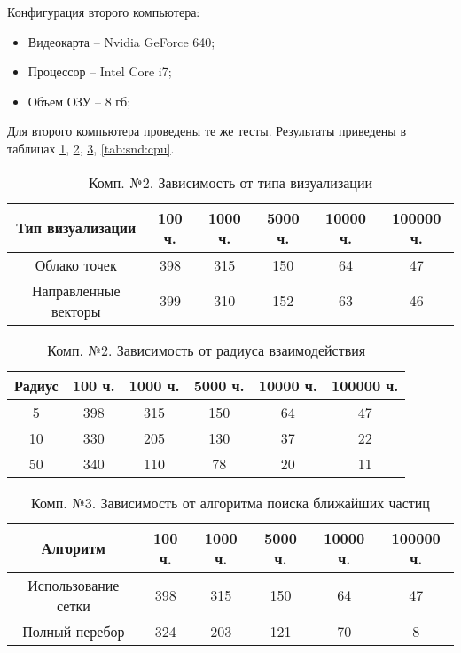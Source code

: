 Конфигурация второго компьютера:

\begin{itemize} 
  \item Видеокарта -- Nvidia GeForce 640;
  \item Процессор -- Intel Core i7;
  \item Объем ОЗУ -- 8 гб;
\end{itemize} 

Для второго компьютера проведены те же тесты. Результаты приведены в таблицах
\ref{tab:snd:simple}, \ref{tab:snd:radius}, \ref{tab:snd:algorithm}, \ref{tab:snd:cpu}.

\begin{table}[H] 
  \caption{\label{tab:snd:simple}Комп. №2. Зависимость от типа визуализации} 
  \begin{center}
    \begin{tabular}{|c|c|c|c|c|c|}
      \hline
      Тип визуализации & 100 ч. & 1000 ч. & 5000 ч. & 10000 ч. & 100000 ч. \\
      \hline
      Облако точек & 398 & 315 & 150 & 64 & 47 \\
      Направленные векторы & 399 & 310 & 152 & 63 & 46 \\
      \hline
    \end{tabular}
  \end{center}
\end{table}

\begin{table}[H]
  \caption{\label{tab:snd:radius}Комп. №2. Зависимость от радиуса взаимодействия}
  \begin{center}
    \begin{tabular}{|c|c|c|c|c|c|}
      \hline
      Радиус & 100 ч. & 1000 ч. & 5000 ч. & 10000 ч. & 100000 ч. \\
      \hline
      5 & 398 & 315 & 150 & 64 & 47 \\
      10 & 330 & 205 & 130 & 37 & 22 \\
      50 & 340 & 110 & 78 & 20 & 11 \\
      \hline
    \end{tabular}
  \end{center}
\end{table}

\begin{table}[H]
  \caption{\label{tab:snd:algorithm}Комп. №3. Зависимость от алгоритма поиска ближайших частиц}
  \begin{center}
    \begin{tabular}{|c|c|c|c|c|c|}
      \hline
      Алгоритм & 100 ч. & 1000 ч. & 5000 ч. & 10000 ч. & 100000 ч. \\
      \hline
      Использование сетки & 398 & 315 & 150 & 64 & 47 \\
      Полный перебор & 324 & 203 & 121 & 70 & 8 \\
      \hline
    \end{tabular}
  \end{center}
\end{table}

